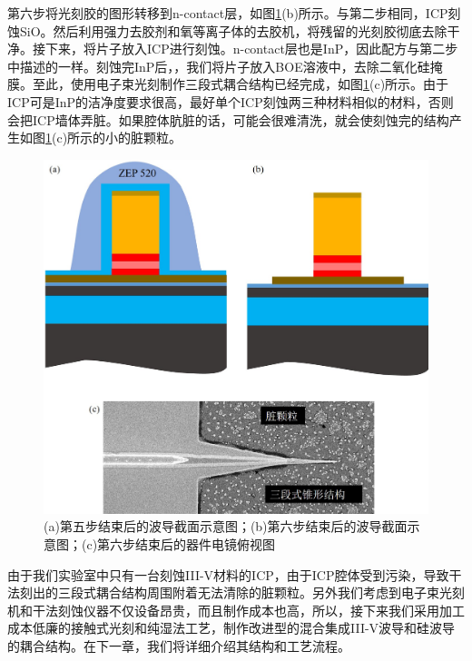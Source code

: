 第六步将光刻胶的图形转移到n-contact层，如图\ref{fig_ch3_step5_6}(b)所示。与第二步相同，ICP刻蚀SiO。然后利用强力去胶剂和氧等离子体的去胶机，将残留的光刻胶彻底去除干净。接下来，将片子放入ICP进行刻蚀。n-contact层也是InP，因此配方与第二步中描述的一样。刻蚀完InP后，，我们将片子放入BOE溶液中，去除二氧化硅掩膜。至此，使用电子束光刻制作三段式耦合结构已经完成，如图\ref{fig_ch3_step5_6}(c)所示。由于ICP可是InP的洁净度要求很高，最好单个ICP刻蚀两三种材料相似的材料，否则会把ICP墙体弄脏。如果腔体肮脏的话，可能会很难清洗，就会使刻蚀完的结构产生如图\ref{fig_ch3_step5_6}(c)所示的小的脏颗粒。
\begin{figure}[htb]
	\centering
	\includegraphics[width=14cm]{./Pictures/fig_ch3_step5_6.jpg}
	\caption{(a)第五步结束后的波导截面示意图；(b)第六步结束后的波导截面示意图；(c)第六步结束后的器件电镜俯视图}
	\label{fig_ch3_step5_6}
\end{figure}

由于我们实验室中只有一台刻蚀III-V材料的ICP，由于ICP腔体受到污染，导致干法刻出的三段式耦合结构周围附着无法清除的脏颗粒。另外我们考虑到电子束光刻机和干法刻蚀仪器不仅设备昂贵，而且制作成本也高，所以，接下来我们采用加工成本低廉的接触式光刻和纯湿法工艺，制作改进型的混合集成III-V波导和硅波导的耦合结构。在下一章，我们将详细介绍其结构和工艺流程。
